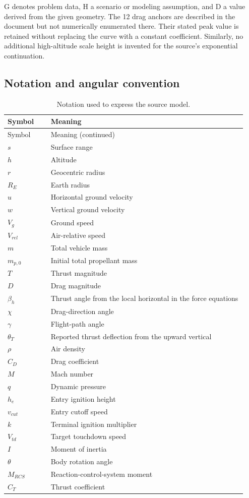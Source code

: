 \documentclass[11pt,a4paper]{article}
\begin{document}


G denotes problem data, H a scenario or modeling assumption, and D a value derived from the given geometry. The 12 drag anchors are described in the document but not numerically enumerated there. Their stated peak value is retained without replacing the curve with a constant coefficient. Similarly, no additional high-altitude scale height is invented for the source's exponential continuation.

\subsection{Notation and angular convention}
\begingroup
\small
\begin{longtable}{@{}p{0.17\linewidth}p{0.77\linewidth}@{}}
\caption{Notation used to express the source model.}\label{tab:notation}\\
\toprule Symbol & Meaning\\ \midrule
\endfirsthead
\toprule Symbol & Meaning (continued)\\ \midrule
\endhead
\bottomrule\endfoot
$s$ & Surface range\\
$h$ & Altitude\\
$r$ & Geocentric radius\\
$R_E$ & Earth radius\\
$u$ & Horizontal ground velocity\\
$w$ & Vertical ground velocity\\
$V_g$ & Ground speed\\
$V_{rel}$ & Air-relative speed\\
$m$ & Total vehicle mass\\
$m_{p,0}$ & Initial total propellant mass\\
$T$ & Thrust magnitude\\
$D$ & Drag magnitude\\
$\beta_h$ & Thrust angle from the local horizontal in the force equations\\
$\chi$ & Drag-direction angle\\
$\gamma$ & Flight-path angle\\
$\theta_T$ & Reported thrust deflection from the upward vertical\\
$\rho$ & Air density\\
$C_D$ & Drag coefficient\\
$M$ & Mach number\\
$q$ & Dynamic pressure\\
$h_e$ & Entry ignition height\\
$v_{cut}$ & Entry cutoff speed\\
$k$ & Terminal ignition multiplier\\
$V_{td}$ & Target touchdown speed\\
$I$ & Moment of inertia\\
$\theta$ & Body rotation angle\\
$M_{RCS}$ & Reaction-control-system moment\\
$C_T$ & Thrust coefficient\\
\end{longtable}
\endgroup
\end{document}
